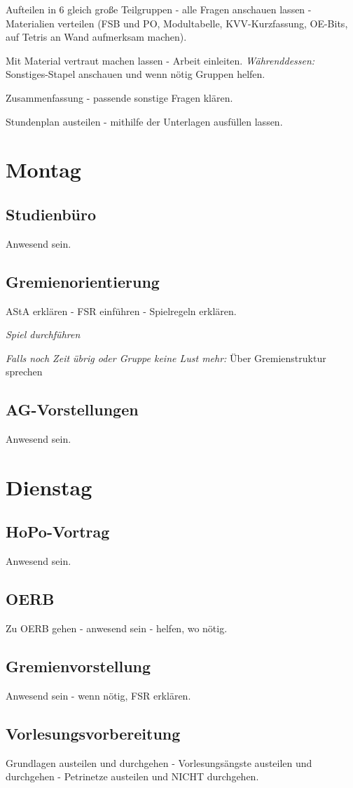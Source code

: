 \documentclass[10pt,a4paper,oneside,ngerman,numbers=noenddot]{scrartcl}
\begin{document}
	Aufteilen in 6 gleich große Teilgruppen - alle Fragen anschauen lassen - Materialien verteilen (FSB und PO, Modultabelle, KVV-Kurzfassung, OE-Bits, auf Tetris an Wand aufmerksam machen).
	
	Mit Material vertraut machen lassen - Arbeit einleiten. \textit{Währenddessen:} Sonstiges-Stapel anschauen und wenn nötig Gruppen helfen.
	
	Zusammenfassung - passende sonstige Fragen klären.
	
	Stundenplan austeilen - mithilfe der Unterlagen ausfüllen lassen.	
\section{Montag}
	\subsection{Studienbüro}
		Anwesend sein.
	\subsection{Gremienorientierung}
		AStA erklären - FSR einführen - Spielregeln erklären.
		
		\textit{Spiel durchführen}
		
		\textit{Falls noch Zeit übrig oder Gruppe keine Lust mehr:} Über Gremienstruktur sprechen
	\subsection{AG-Vorstellungen}
		Anwesend sein.
	
\section{Dienstag}
	\subsection{HoPo-Vortrag}
		Anwesend sein.
	\subsection{OERB}
		Zu OERB gehen - anwesend sein - helfen, wo nötig.
	\subsection{Gremienvorstellung}
		Anwesend sein - wenn nötig, FSR erklären.
	\subsection{Vorlesungsvorbereitung}
		Grundlagen austeilen und durchgehen - Vorlesungsängste austeilen und durchgehen - Petrinetze austeilen und NICHT durchgehen.
\end{document}
